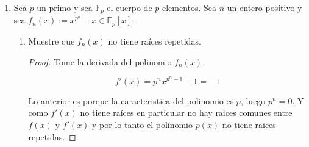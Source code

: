 \documentclass[letter,twoside,12pt]{article}
\begin{document}
\begin{enumerate}
\begin{proof}
Por la definición del coeficiente binomial tenemos que $ \binom{p}{k}k!(p-k)!=p! $. Ahora vamos a probar que $ p $ es primo relativo con $ k!(p-k)! $ porque la restricción sobre $ k $ asegura que tanto $ k $ como $ p-k $ son menores estrictamente a $ p $. Y por lo tanto como todo número menor a $ p $ es primo relativo con $ p $ se cumple que tanto $ k! $ como $ (p-k)! $ son primos relativos con $ p $ y luego $ (p-k)!k! $ es primo relativo con $ p $. Ahora claramente $ p|p! $, luego concluimos que $ p|\binom{p}{k} $. Pero como el cuerpo es de caracteristica $ p $ tenemos que $ p = 0 $, por lo tanto

\begin{eqnarray}
\text{Frob}_p(x+y)&=&\sum_{k=0}^p \binom{p}{k}x^{p-k}y^k. \nonumber
\\&=&\binom{p}{0}x^p+\binom{p}{p}y^p\nonumber
\\&=&x^p+y^p \nonumber
\\&=& \text{Frob}_p(x)+\text{Frob}_p(y) \nonumber
\end{eqnarray}

Por otra parte $ \text{Frob}_p(xy)= (xy)^p  $, pero como en un campo la multiplicación es conmutativa tenemos que $ (xy)^p = x^py^p = \text{Frob}_p(x)\text{Frob}_p(y) $.

Ahora para probar que es inyectivo solo basta demostrar que el homomorfismo es diferente del homomorfismo 0, pues estamos en un campo y este es el caso porque por ejemplo si consideramos el elemento 1, $ \text{Frob}_p(1)=1^p=1 $.
\end{proof}

\item Sea $ p $ un primo y sea $ \mathbb{F}_p $ el cuerpo de $ p $ elementos. Sea $ n $ un entero positivo y sea $ f_n(x) := x^{p^n}-x \in \mathbb{F}_p[x] $.

\begin{enumerate}
\item Muestre que $ f_n(x) $ no tiene raíces repetidas.

\begin{proof}
Tome la derivada del polinomio $ f_n(x) $.

\begin{equation}
f'(x)=p^nx^{p^n-1}-1 = -1 \nonumber
\end{equation}

Lo anterior es porque la caracteristica del polinomio es $ p $, luego $ p^n=0 $. Y como $ f'(x) $ no tiene raíces en particular no hay raices comunes entre $ f(x) $ y $ f'(x) $ y por lo tanto el polinomio $ p(x) $ no tiene raices repetidas.
\end{proof}


\end{enumerate}
\end{enumerate}
\end{document}

